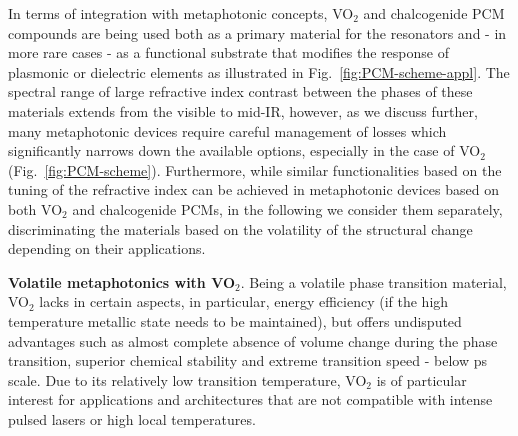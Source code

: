 \documentclass[journal=chreay,manuscript=review]{achemso}
\begin{document}
In terms of integration with metaphotonic concepts, VO$_2$ and chalcogenide PCM compounds are being used both as a primary material for the resonators \cite{karvounis2016all,Tian2019active,kepic2021optically} and - in more rare cases - as a functional substrate that modifies the response of plasmonic or dielectric elements\cite{galarreta2018nonvolatile,tripathi2021tunable} as illustrated in Fig.~\ref{fig:PCM-scheme-appl}. The spectral range of large refractive index contrast between the phases of these materials extends from the visible to mid-IR, however, as we discuss further, many metaphotonic devices require careful management of losses which significantly narrows down the available options, especially in the case of VO$_2$ (Fig.~\ref{fig:PCM-scheme}). Furthermore, while similar functionalities based on the tuning of the refractive index can be achieved in metaphotonic devices based on both VO$_2$ and chalcogenide PCMs, in the following we consider them separately, discriminating the materials based on the volatility of the structural change depending on their applications.

{\bf Volatile metaphotonics with VO$_2$}. Being a volatile phase transition material, VO$_2$ lacks in certain aspects, in particular, energy efficiency (if the high temperature metallic state needs to be maintained), but offers undisputed advantages such as almost complete absence of volume change during the phase transition, superior chemical stability and extreme transition speed - below ps scale\cite{wegkamp2015ultrafast, jager2017tracking}. Due to its relatively low transition temperature, VO$_2$ is of particular interest for applications and architectures that are not compatible with intense pulsed lasers or high local temperatures.
\end{document}
